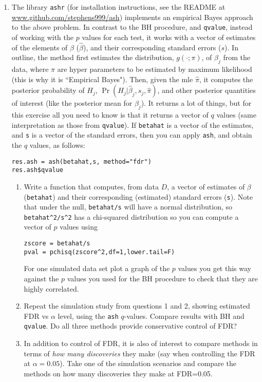 \documentclass[12pt]{article}
\begin{document}
\begin{enumerate}
\item The library {\tt ashr} (for installation instructions, see the README at \url{www.github.com/stephens999/ash}) 
implements an empirical Bayes approach to the above problem. In contrast to the BH procedure, and {\tt qvalue},
instead of
working with the $p$ values for each test, it works with a vector of estimates of the elements of $\beta$ ($\hat\beta$), and their corresponding standard errors ($s$).
In outline, the method first estimates the distribution, $g(\cdot; \pi)$, of $\beta_j$ from the data, where $\pi$ are hyper parameters to be estimated by maximum likelihood (this is
why it is ``Empirical Bayes"). Then, given the mle $\hat\pi$, it computes the posterior probability of $H_j$, $\Pr(H_j | \hat\beta_j, s_j, \hat\pi)$, and
other posterior quantities of interest (like the posterior mean for $\beta_j$). It returns a lot of things, but for this exercise all you need to know is that it returns a vector of $q$ values (same interpretation as those from {\tt qvalue}).
If {\tt betahat} is a vector of the estimates, and {\tt s} is a vector of the standard errors, then you can apply {\tt ash}, and obtain the $q$ values, as follows:
\begin{verbatim}
res.ash = ash(betahat,s, method="fdr")
res.ash$qvalue
\end{verbatim}
\begin{enumerate}
\item Write a function that computes, from data $D$, a vector of estimates of $\beta$ ({\tt betahat}) and their corresponding (estimated) standard errors ({\tt s}).
Note that under the null, {\tt betahat/s} will have a normal distribution, so \verb|betahat^2/s^2|
has a chi-squared distribution
so you can compute a vector of $p$ values using 
\begin{verbatim}
zscore = betahat/s
pval = pchisq(zscore^2,df=1,lower.tail=F)
\end{verbatim}
For one simulated data set plot a graph of the $p$ values you get this way against the $p$ values you used for the BH procedure to check that they are highly correlated.

\item Repeat the simulation study from questions 1 and 2, showing estimated FDR vs $\alpha$ level, using the {\tt ash} $q$-values. Compare results with
BH and {\tt qvalue}. Do all three methods provide conservative control of FDR? 

\item In addition to control of FDR, it is also of interest to compare methods in terms of {\it how many discoveries} they make (say when
controlling the FDR at $\alpha=0.05$).
Take one of the simulation scenarios and compare the methods on how many discoveries they make at FDR=0.05.
\end{enumerate}


\end{enumerate}
\end{document}
